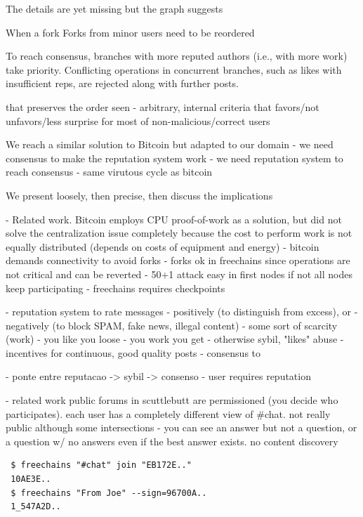 \documentclass[10pt,journal,compsoc]{IEEEtran}
\begin{document}
The details are yet missing but the graph suggests

When a fork
Forks from minor users need to be reordered

To reach consensus, branches with more reputed authors
(i.e., with more work) take priority. Conflicting operations in
concurrent branches, such as likes with insufficient reps, are
rejected along with further posts.


that preserves the order seen
- arbitrary, internal criteria that favors/not unfavors/less surprise for most
  of non-malicious/correct users

We reach a similar solution to Bitcoin but adapted to our domain
- we need consensus to make the reputation system work
- we need reputation system to reach consensus
- same virutous cycle as bitcoin

We present loosely, then precise, then discuss the implications


- Related work.
Bitcoin employs CPU proof-of-work as a solution, but did not solve the
centralization issue completely because the cost to perform work is not
equally distributed
(depends on costs of equipment and energy)
    - bitcoin demands connectivity to avoid forks
    - forks ok in freechains since operations are not critical and can be reverted
    - 50+1 attack easy in first nodes if not all nodes keep participating
        - freechains requires checkpoints


- reputation system to rate messages
    - positively (to distinguish from excess), or
    - negatively (to block SPAM, fake news, illegal content)
- some sort of scarcity (work)
    - you like you loose
    - you work you get
    - otherwise sybil, "likes" abuse
    - incentives for continuous, good quality posts
- consensus to 


- ponte entre reputacao -> sybil -> consenso
- user requires reputation

- related work public forums in scuttlebutt are permissioned (you decide who
  participates). each user has a completely different view of \#chat. not really
  public although some intersections
    - you can see an answer but not a question, or a question w/ no answers
      even if the best answer exists. no content discovery


{\footnotesize
\begin{verbatim}
 $ freechains "#chat" join "EB172E.."
 10AE3E..
 $ freechains "From Joe" --sign=96700A..
 1_547A2D..
\end{verbatim}
}
\end{document}
